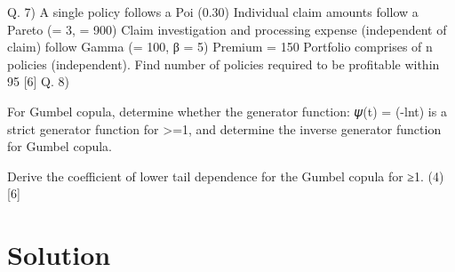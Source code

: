 Q. 7)
A single policy follows a Poi (0.30)
Individual claim amounts follow a Pareto (\alpha = 3, \lambda = 900)
Claim investigation and processing expense (independent of claim) follow Gamma (\alpha = 100, β = 5)
Premium = 150
Portfolio comprises of n policies (independent).
Find number of policies required to be profitable within 95%
[6]
Q. 8)
\item  For Gumbel copula, determine whether the generator function:
𝜓(t) = (-lnt) \alpha
is a strict generator function for \alpha >=1, and determine the inverse generator function for Gumbel copula.

\item   Derive the coefficient of lower tail dependence for the Gumbel copula for \alpha≥1.
(4)
[6]


\section*{Solution}
